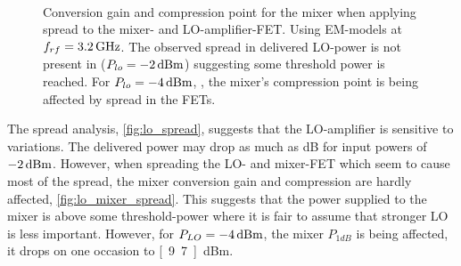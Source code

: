 			
			\begin{figure}[hpt!]
				\centering 
				 \\
				\caption{Conversion gain and compression point for the mixer when applying spread to the mixer- and LO-amplifier-FET. Using EM-models at $f_{rf}=\unit[3.2]{GHz}$. The observed spread in delivered LO-power is not present in  ($P_{lo}=\unit[-2]{dBm}$) suggesting some threshold power is reached. For $P_{lo}=\unit[-4]{dBm}$, , the mixer's compression point is being affected by spread in the FETs.}\label{fig:lo_mixer_spread}
			\end{figure}
			
	
			
			

		
		
			The spread analysis, \autoref{fig:lo_spread}, suggests that the LO-amplifier is sensitive to variations. The delivered power may drop as much as \unit[2]{dB} for input powers of $\unit[-2]{dBm}$. %
However, when spreading the LO- and mixer-FET which seem to cause most of the spread, the mixer conversion gain and compression are hardly affected, \autoref{fig:lo_mixer_spread}. This suggests that the power supplied to the mixer is above some threshold-power where it is fair to assume that stronger LO is less important\autocite{yhland1999}. However, for $P_{LO}=\unit[-4]{dBm}$, the mixer $P_{1dB}$ is being affected, it drops on one occasion to \unit[9.7]{dBm}.

